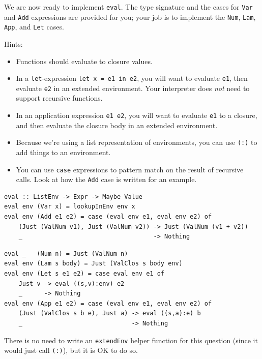 \documentclass[addpoints]{exam}
\begin{document}
\begin{questions}
\newpage

We are now ready to implement \verb|eval|.  The type signature and the cases for \verb|Var| and \verb|Add| expressions are provided for you; your job is to implement the \verb|Num|, \verb|Lam|, \verb|App|, and \verb|Let| cases.

Hints:

\begin{itemize}
\item Functions should evaluate to closure values.
\item In a \verb|let|-expression \verb|let x = e1 in e2|, you will want to evaluate \verb|e1|, then evaluate \verb|e2| in an extended environment.  Your interpreter does \emph{not} need to support recursive functions.
\item In an application expression \verb|e1 e2|, you will want to evaluate \verb|e1| to a closure, and then evaluate the closure body in an extended environment.
\item Because we're using a list representation of environments, you can use \verb|(:)| to add things to an environment.  
\item You can use \verb|case| expressions to pattern match on the result of recursive calls.  Look at how the \verb|Add| case is written for an example.
\end{itemize}

\begin{verbatim}
eval :: ListEnv -> Expr -> Maybe Value
eval env (Var x) = lookupInEnv env x
eval env (Add e1 e2) = case (eval env e1, eval env e2) of
    (Just (ValNum v1), Just (ValNum v2)) -> Just (ValNum (v1 + v2))
    _                                    -> Nothing
\end{verbatim}
\begin{solutionorbox}[\stretch{1}]
\begin{verbatim}
eval _   (Num n) = Just (ValNum n)
eval env (Lam s body) = Just (ValClos s body env)
eval env (Let s e1 e2) = case eval env e1 of
    Just v -> eval ((s,v):env) e2
    _      -> Nothing
eval env (App e1 e2) = case (eval env e1, eval env e2) of
    (Just (ValClos s b e), Just a) -> eval ((s,a):e) b
    _                              -> Nothing
\end{verbatim}
There is no need to write an \verb|extendEnv| helper function for this question (since it would just call \verb|(:)|), but it is OK to do so.
\end{solutionorbox}

\newpage
  

\end{questions}
\end{document}
